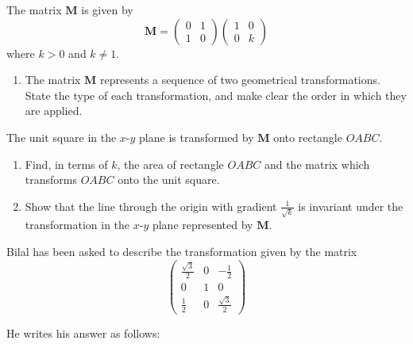 \documentclass[leqno]{article}
\begin{document}
\begin{enumerate}[
  label=\textbf{\arabic*.},
  leftmargin=*,
  topsep=0pt,
  partopsep=0pt,
  parsep=0pt
]
The matrix $\mathbf{M}$ is given by
\[
\mathbf{M} = \begin{pmatrix} 0 & 1 \\ 1 & 0 \end{pmatrix}\begin{pmatrix} 1 & 0 \\ 0 & k \end{pmatrix}
\]
where $k>0$ and $k \ne 1$. \\

\begin{enumerate}[label=\textbf{(\alph*)}]
  \item The matrix $\mathbf{M}$ represents a sequence of two geometrical transformations. State the type of each transformation, and make clear the order in which they are applied.  \\
\end{enumerate}

The unit square in the $x$-$y$ plane is transformed by $\mathbf{M}$ onto rectangle $OABC$. \\

\begin{enumerate}[label=\textbf{(\alph*)}, resume]
  \item Find, in terms of $k$, the area of rectangle $OABC$ and the matrix which transforms $OABC$ onto the unit square.  \\
  \item Show that the line through the origin with gradient $\frac{1}{\sqrt{k}}$ is invariant under the transformation in the $x$-$y$ plane represented by $\mathbf{M}$.  \\
\end{enumerate}

\newpage

\questionitem

Bilal has been asked to describe the transformation given by the matrix
\[
\begin{pmatrix}
\frac{\sqrt{3}}{2} & 0 & -\frac{1}{2} \\
0 & 1 & 0 \\
\frac{1}{2} & 0 & \frac{\sqrt{3}}{2}
\end{pmatrix}
\]

He writes his answer as follows: \\


 \\[10pt]


\end{enumerate}
\end{document}
